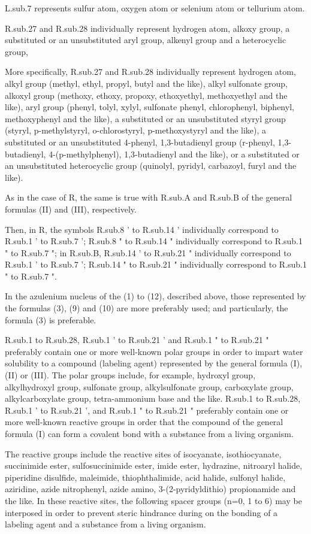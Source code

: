 \documentclass[11pt,a4paper]{article}
\begin{document}
L.sub.7 represents sulfur atom, oxygen atom or selenium atom or tellurium atom.

R.sub.27 and R.sub.28 individually represent hydrogen atom, alkoxy group, a substituted or an unsubstituted aryl group, alkenyl group and a heterocyclic group,

More specifically, R.sub.27 and R.sub.28 individually represent hydrogen atom, alkyl group (methyl, ethyl, propyl, butyl and the like), alkyl sulfonate group, alkoxyl group (methoxy, ethoxy, propoxy, ethoxyethyl, methoxyethyl and the like), aryl group (phenyl, tolyl, xylyl, sulfonate phenyl, chlorophenyl, biphenyl, methoxyphenyl and the like), a substituted or an unsubstituted styryl group (styryl, p-methylstyryl, o-chlorostyryl, p-methoxystyryl and the like), a substituted or an unsubstituted 4-phenyl, 1,3-butadienyl group (r-phenyl, 1,3-butadienyl, 4-(p-methylphenyl), 1,3-butadienyl and the like), or a substituted or an unsubstituted heterocyclic group (quinolyl, pyridyl, carbazoyl, furyl and the like).

As in the case of R, the same is true with R.sub.A and R.sub.B of the general formulas (II) and (III), respectively.

Then, in R, the symbols R.sub.8 ' to R.sub.14 ' individually correspond to R.sub.1 ' to R.sub.7 '; R.sub.8 " to R.sub.14 " individually correspond to R.sub.1 " to R.sub.7 "; in R.sub.B, R.sub.14 ' to R.sub.21 " individually correspond to R.sub.1 ' to R.sub.7 '; R.sub.14 " to R.sub.21 " individually correspond to R.sub.1 " to R.sub.7 ".

In the azulenium nucleus of the (1) to (12), described above, those represented by the formulas (3), (9) and (10) are more preferably used; and particularly, the formula (3) is preferable.

R.sub.1 to R.sub.28, R.sub.1 ' to R.sub.21 ' and R.sub.1 " to R.sub.21 " preferably contain one or more well-known polar groups in order to impart water solubility to a compound (labeling agent) represented by the general formula (I), (II) or (III). The polar groups include, for example, hydroxyl group, alkylhydroxyl group, sulfonate group, alkylsulfonate group, carboxylate group, alkylcarboxylate group, tetra-ammonium base and the like. R.sub.1 to R.sub.28, R.sub.1 ' to R.sub.21 ', and R.sub.1 " to R.sub.21 " preferably contain one or more well-known reactive groups in order that the compound of the general formula (I) can form a covalent bond with a substance from a living organism.

The reactive groups include the reactive sites of isocyanate, isothiocyanate, succinimide ester, sulfosuccinimide ester, imide ester, hydrazine, nitroaryl halide, piperidine disulfide, maleimide, thiophthalimide, acid halide, sulfonyl halide, aziridine, azide nitrophenyl, azide amino, 3-(2-pyridyldithio) propionamide and the like. In these reactive sites, the following spacer groups (n=0, 1 to 6) may be interposed in order to prevent steric hindrance during on the bonding of a labeling agent and a substance from a living organism.
\end{document}
